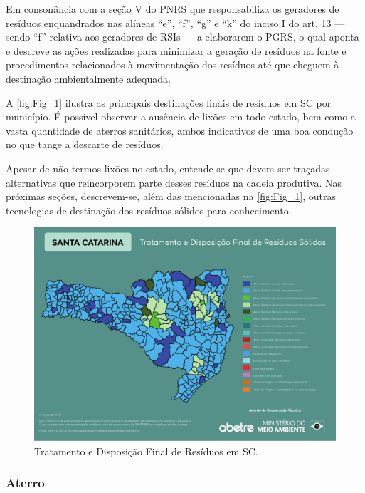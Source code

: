 Em consonância com a seção V do \gls{PNRS} que responsabiliza os geradores de resíduos enquandrados nas alíneas  “e”, “f”, “g” e “k” do inciso I do art. 13 — sendo “f” relativa aos geradores de \gls{RSI}s — a elaborarem o \gls{PGRS}, o qual aponta e descreve as ações realizadas para minimizar a geração de resíduos na fonte e procedimentos relacionados à movimentação dos resíduos até que cheguem à destinação ambientalmente adequada.

A \autoref{fig:Fig_1} ilustra as principais destinações finais de resíduos em \gls{SC} por município. É possível observar a ausência de lixões em todo estado, bem como a vasta quantidade de aterros sanitários, ambos indicativos de uma boa condução no que tange a descarte de resíduos.

Apesar de não termos lixões no estado, entende-se que devem ser traçadas alternativas que reincorporem parte desses resíduos na cadeia produtiva. Nas próximas seções, descrevem-se, além das mencionadas na \autoref{fig:Fig_1}, outras tecnologias de destinação dos resíduos sólidos para conhecimento.


\begin{figure}[h]
	\caption{\label{fig:Fig_1} Tratamento e Disposição Final de Resíduos em \gls{SC}.}
	\begin{center}
		\includegraphics[scale=0.52]{images/abetre_sc.pdf}
	\end{center}
\end{figure}

\pagebreak
\subsubsection{Aterro}

